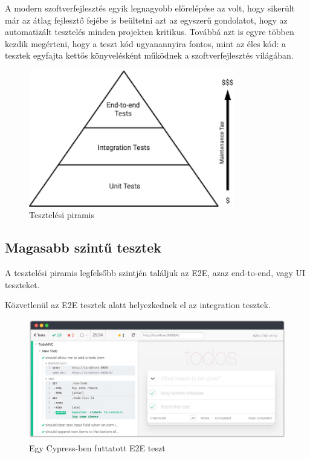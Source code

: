 A modern szoftverfejlesztés egyik legnagyobb előrelépése az volt, hogy sikerült már az átlag fejlesztő fejébe is beültetni azt az egyszerű gondolatot, hogy az automatizált tesztelés minden projekten kritikus. Továbbá azt is egyre többen kezdik megérteni, hogy a teszt kód ugyanannyira fontos, mint az éles kód: a tesztek egyfajta kettős könyvelésként működnek a szoftverfejlesztés világában.

\begin{figure}[H]
    \centering
    \includegraphics[width=0.8\textwidth]{images/piramis.png}
    \caption{Tesztelési piramis}
    \label{fig:testing-pyramid}
\end{figure}

\subsection{Magasabb szintű tesztek}

A tesztelési piramis legfelsőbb szintjén találjuk az E2E, azaz end-to-end, vagy UI teszteket.

Közvetlenül az E2E tesztek alatt helyezkednek el az integration tesztek.

\begin{figure}[H]
    \centering
    \includegraphics[width=1\textwidth]{images/cypress.png}
    \caption{Egy Cypress-ben futtatott E2E teszt}
    \label{fig:cypress-example}
\end{figure}


